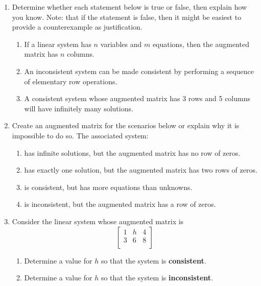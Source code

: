 \documentclass[basic]{inVerba-notes}
\begin{document}
\begin{enumerate}[align=left, leftmargin=0pt, labelindent=\parindent, listparindent=\parindent, labelwidth=0pt, itemindent=!]\color{minor}

  \item Determine whether each statement below is true or false, then explain how you know. Note: that if the statement is false, then it might be easiest to provide a counterexample as justification.
  \begin{enumerate}
    \item {} If a linear system has \(n\) variables and \(m\) equations, then the augmented matrix has
    \(n\) columns.
    \item {} An inconsistent system can be made consistent by performing a sequence of elementary row operations.
    \item {} A consistent system whose augmented matrix has 3 rows and 5 columns will have infinitely many solutions.
  \end{enumerate}

  \newpage

  \item Create an augmented matrix for the scenarios below or explain why it is impossible to do so. The associated system:
  
  \begin{enumerate}
    \item {} has infinite solutions, but the augmented matrix has no row of zeros.
    \item {} has exactly one solution, but the augmented matrix has two rows of zeros.
    \item {} is consistent, but has more equations than unknowns.
    \item {} is inconsistent, but the augmented matrix has a row of zeros.
  \end{enumerate}

  \newpage

  \item Consider the linear system whose augmented matrix is
  \[%
  \begin{bmatrix}
  1 & h & 4 \\
  3 & 6 & 8 \\
  \end{bmatrix}
  \]%
  \begin{enumerate}
    \item Determine a value for \(h\) so that the system is \textbf{consistent}.
    \item Determine a value for \(h\) so that the system is \textbf{inconsistent}.
  \end{enumerate}


\end{enumerate}
\end{document}
